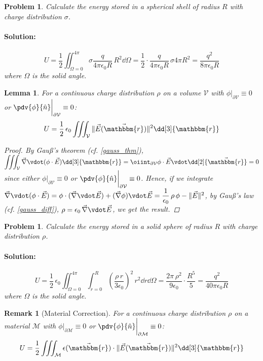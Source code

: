 \documentclass[12pt]{article}
\renewcommand{\grad}{\vec{\nabla}}
\renewcommand{\div}{\vec{\nabla}\vdot}
\newcommand*{\ir}{\mathbbm{r}}
\newcommand*{\irv}{\vec{\mathbbm{r}}}
\newcommand*{\vE}{\vec{E}}
\newcommand*{\ee}{\epsilon_0}
\newcommand*{\vol}{\mathcal{V}}
\newcommand*{\mat}{\mathcal{M}}
\newtheorem{lemma}[theorem]{Lemma}
\newtheorem{remark}[theorem]{Remark}
\newtheorem{problem}[theorem]{Problem}
\newenvironment{solution}{\paragraph{Solution:}}{\hfill}
\begin{document}
\begin{problem}
  Calculate the energy stored in a spherical shell of radius $R$ with charge distribution $\sigma$. 
  \begin{solution}
  $$U=\frac{1}{2}\iint_{\Omega=0}^{4\pi} \sigma \frac{q}{4\pi\ee R}\,R^2\dd{\Omega}=\frac{1}{2}\cdot\frac{q}{4\pi\ee R}\,\sigma 4\pi R^2=\frac{q^2}{8\pi\ee R}$$ where $\Omega$ is the solid angle.
  \end{solution}
\end{problem}

\begin{lemma}
  \label{energy_el_square}
  For a continuous charge distribution $\rho$ on a volume $\vol$ with $\phi\big|_{\partial\vol}\equiv 0$ or $\displaystyle\pdv{\phi}{\hat{n}}\bigg|_{\partial\vol}\equiv 0$:
  $$U=\frac{1}{2}\,\ee\iiint_\vol \|\vE(\irv)\|^2\dd[3]{\ir}$$
  \begin{proof}
    By Gauß's theorem (cf. \ref{gauss_thm}),
    $\displaystyle\iiint_\vol \div(\phi\cdot\vE)\dd[3]{\ir}=\oiint_{\partial\vol}\phi\cdot\vE\vdot\dd[2]{\irv}=0$ since either $\phi\big|_{\partial\vol}\equiv 0$ or $\displaystyle\pdv{\phi}{\hat{n}}\bigg|_{\partial\vol}\equiv 0$. Hence, if we integrate $\div(\phi\cdot\vE)=\phi\cdot (\div\vE)+(\grad\phi)\vdot\vE=\dfrac{1}{\ee}\,\rho\,\phi-\|\vE\|^2$, by Gauß's law (cf. \ref{gauss_diff}), $\rho=\ee\,\div\vE$, we get the result.
  \end{proof}
\end{lemma}

\begin{problem}
  Calculate the energy stored in a solid sphere of radius $R$ with charge distribution $\rho$. 
  \begin{solution}
    $$U=\frac{1}{2}\,\ee\iint_{\Omega=0}^{4\pi}\int_{r=0}^R \left(\frac{\rho\,r}{3\ee}\right)^2\,r^2\dd{r}\dd{\Omega}=\frac{2\pi\,\rho^2}{9\ee}\cdot\frac{R^5}{5}=\frac{q^2}{40\pi\ee R}$$ where $\Omega$ is the solid angle.
  \end{solution}
\end{problem}

\begin{remark}[Material Correction]
  For a continuous charge distribution $\rho$ on a material $\mat$ with $\phi\big|_{\partial\mat}\equiv 0$ or $\displaystyle\pdv{\phi}{\hat{n}}\bigg|_{\partial\mat}\equiv 0$:
  $$U=\frac{1}{2}\iiint_\mat \epsilon(\irv)\cdot\|\vE(\irv)\|^2\dd[3]{\ir}$$
\end{remark}

\pagebreak
\end{document}
